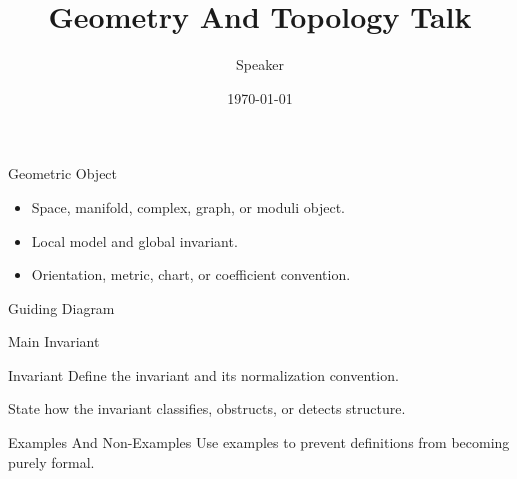\documentclass[10pt,aspectratio=169]{beamer}
\title{Geometry And Topology Talk}
\author{Speaker}
\date{\today}
\begin{document}
\begin{frame}\titlepage\end{frame}

\begin{frame}{Geometric Object}
  \begin{itemize}
    \item Space, manifold, complex, graph, or moduli object.
    \item Local model and global invariant.
    \item Orientation, metric, chart, or coefficient convention.
  \end{itemize}
\end{frame}

\begin{frame}{Guiding Diagram}
  \centering
\end{frame}

\begin{frame}{Main Invariant}
  \begin{block}{Invariant}
    Define the invariant and its normalization convention.
  \end{block}
  \begin{theorem}
    State how the invariant classifies, obstructs, or detects structure.
  \end{theorem}
\end{frame}

\begin{frame}{Examples And Non-Examples}
  Use examples to prevent definitions from becoming purely formal.
\end{frame}
\end{document}
